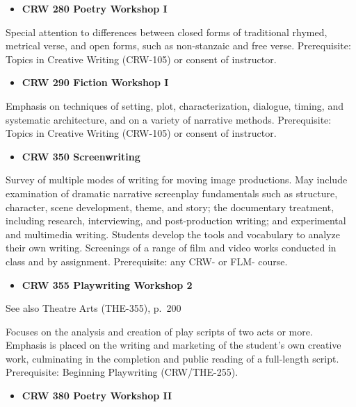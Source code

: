 \documentclass[
  letterpaper,
]{scrbook}
\providecommand{\tightlist}{%
  \setlength{\itemsep}{0pt}\setlength{\parskip}{0pt}}
\begin{document}
\begin{itemize}
\tightlist
\item
  \textbf{CRW 280 Poetry Workshop I}
\end{itemize}

Special attention to differences between closed forms of traditional
rhymed, metrical verse, and open forms, such as non-stanzaic and free
verse. Prerequisite: Topics in Creative Writing (CRW-105) or consent of
instructor.

\begin{itemize}
\tightlist
\item
  \textbf{CRW 290 Fiction Workshop I}
\end{itemize}

Emphasis on techniques of setting, plot, characterization, dialogue,
timing, and systematic architecture, and on a variety of narrative
methods. Prerequisite: Topics in Creative Writing (CRW-105) or consent
of instructor.

\begin{itemize}
\tightlist
\item
  \textbf{CRW 350 Screenwriting}
\end{itemize}

Survey of multiple modes of writing for moving image productions. May
include examination of dramatic narrative screenplay fundamentals such
as structure, character, scene development, theme, and story; the
documentary treatment, including research, interviewing, and
post-production writing; and experimental and multimedia writing.
Students develop the tools and vocabulary to analyze their own writing.
Screenings of a range of film and video works conducted in class and by
assignment. Prerequisite: any CRW- or FLM- course.

\begin{itemize}
\tightlist
\item
  \textbf{CRW 355 Playwriting Workshop 2}
\end{itemize}

See also Theatre Arts (THE-355), p.~200

Focuses on the analysis and creation of play scripts of two acts or
more. Emphasis is placed on the writing and marketing of the student's
own creative work, culminating in the completion and public reading of a
full-length script. Prerequisite: Beginning Playwriting (CRW/THE-255).

\begin{itemize}
\tightlist
\item
  \textbf{CRW 380 Poetry Workshop II}
\end{itemize}
\end{document}
